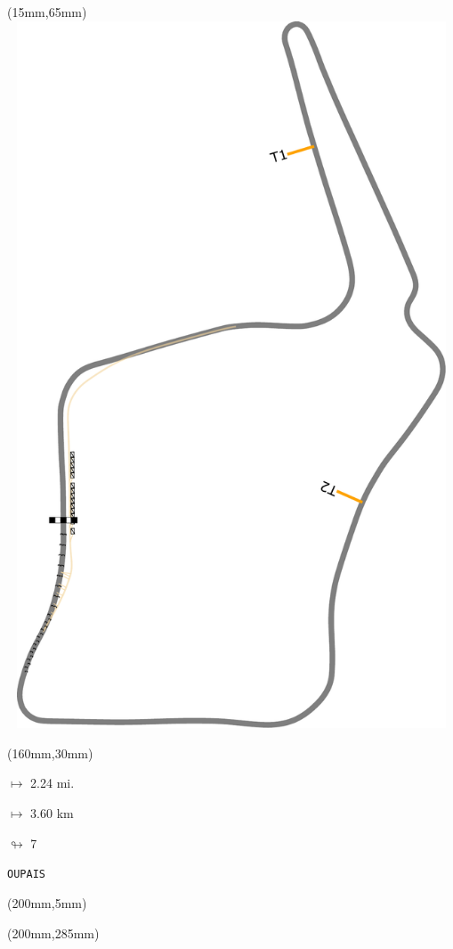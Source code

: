 \begin{textblock*}{185mm}(15mm,65mm)%
\centering
\mbox{\includegraphics[width=185mm,height=210mm,keepaspectratio]{PT/OUPAIS.pdf}}
\end{textblock*}
\begin{textblock*}{40mm}(160mm,30mm)%
\Large
\par$\mapsto$ 2.24 mi.
\par$\mapsto$ 3.60 km
\par$\looparrowright$ 7
\par\hfill\tiny\tt OUPAIS\\
\end{textblock*}
\begin{textblock*}{20mm}(200mm,5mm)%
\fbox{\thepage}
\label{OUPAIS}
\end{textblock*}
\begin{textblock*}{20mm}(200mm,285mm)%
\fbox{\thepage}
\end{textblock*}

